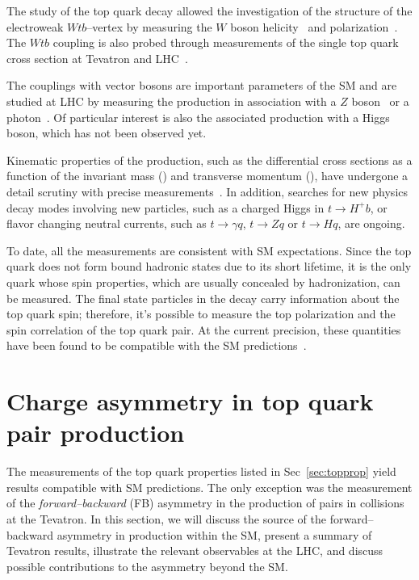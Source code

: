 The study of the top quark decay allowed the investigation of the structure of the
electroweak $Wtb$--vertex by measuring the $W$ boson
helicity~\cite{Khachatryan:2014vma} and
polarization~\cite{ATLAS-CONF-2013-033}.
The $Wtb$ coupling is also probed through measurements of the single
top quark cross section at Tevatron and LHC~\cite{Aad:2014fwa}.

The couplings with vector bosons are important parameters of the SM
and are studied at LHC by measuring the \ttbar{} production in
association with a $Z$ boson~\cite{ATLAS-CONF-2014-038} or a
photon~\cite{CMS-PAS-TOP-13-011}. Of particular interest is also the
associated production with a Higgs boson, which has not been observed
yet.

Kinematic properties of the \ttbar{} production, such as the
differential cross sections as a function of the \ttbar{} invariant
mass (\mtt{}) and transverse momentum (\pttt{}), have undergone a
detail scrutiny with precise measurements~\cite{ATLAS-CONF-2014-057}. 
In addition, searches for new physics
decay modes involving new particles, such as a charged Higgs in $t\to
H^+b$, or flavor changing neutral currents, such as $t\to \gamma q$,
$t\to Z q$ or $t\to H q$, are ongoing.

To date, all the measurements are consistent with SM expectations.
Since the top quark does not form bound hadronic states due to its
short lifetime, it is the only quark whose spin properties, which are usually
concealed by hadronization, can be measured. The final state
particles in the decay carry information about the top quark spin;
therefore, it's possible to measure the top polarization and the spin
correlation of the top quark pair. At the current precision, these
quantities have been found to be compatible with the SM
predictions~\cite{Aad:2013ksa,Aad:2014pwa,Chatrchyan:2013wua}. 

\section{Charge asymmetry in top quark pair production}
\label{sec:topca}

The measurements of the top quark properties listed in
Sec~\ref{sec:topprop} yield results compatible with SM predictions.
The only exception was the measurement of the {\it forward--backward}
(FB) asymmetry in the production of \ttbar{} pairs in \ppbar{}
collisions at the Tevatron. In this section, we will discuss the
source of the forward--backward asymmetry in \ttbar{} production
within the SM, present a summary of Tevatron results, illustrate the
relevant observables at the LHC, and discuss possible contributions to
the asymmetry beyond the SM.

